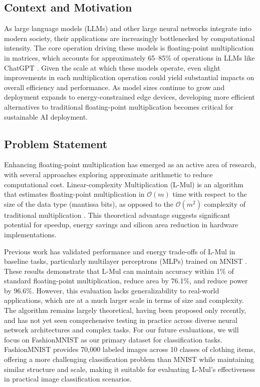 \documentclass[12pt,letterpaper]{article}
\begin{document}

\clearpage
\makeappendix

\subsection{Context and Motivation}

As large language models (LLMs) and other large neural networks integrate into modern society, their applications are increasingly bottlenecked by computational intensity. The core operation driving these models is floating-point multiplication in matrices, which accounts for approximately 65--85\% of operations in LLMs like ChatGPT \citep{dettmers2022llmint8}. Given the scale at which these models operate, even slight improvements in each multiplication operation could yield substantial impacts on overall efficiency and performance. As model sizes continue to grow and deployment expands to energy-constrained edge devices, developing more efficient alternatives to traditional floating-point multiplication becomes critical for sustainable AI deployment.

\subsection{Problem Statement}

Enhancing floating-point multiplication has emerged as an active area of research, with several approaches exploring approximate arithmetic to reduce computational cost. Linear-complexity Multiplication (L-Mul) is an algorithm that estimates floating-point multiplication in $\mathcal{O}(m)$ time with respect to the size of the data type (mantissa bits), as opposed to the $\mathcal{O}(m^2)$ complexity of traditional multiplication \citep{luo2024addition}. This theoretical advantage suggests significant potential for speedup, energy savings and silicon area reduction in hardware implementations.

Previous work has validated performance and energy trade-offs of L-Mul in baseline tasks, particularly multilayer perceptrons (MLPs) trained on MNIST \citep{lmul2023capstone}. These results demonstrate that L-Mul can maintain accuracy within 1\% of standard floating-point multiplication, reduce area by 76.1\%, and reduce power by 96.6\%. However, this evaluation lacks generalizability to real-world applications, which are at a much larger scale in terms of size and complexity. The algorithm remains largely theoretical, having been proposed only recently, and has not yet seen comprehensive testing in practice across diverse neural network architectures and complex tasks. For our future evaluations, we will focus on FashionMNIST as our primary dataset for classification tasks. FashionMNIST provides 70,000 labeled images across 10 classes of clothing items, offering a more challenging classification problem than MNIST while maintaining similar structure and scale, making it suitable for evaluating L-Mul's effectiveness in practical image classification scenarios.
\end{document}
